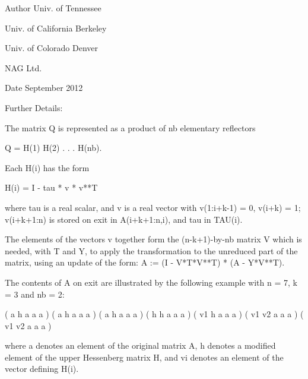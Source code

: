 \begin{DoxyAuthor}{Author}
Univ. of Tennessee 

Univ. of California Berkeley 

Univ. of Colorado Denver 

N\+A\+G Ltd. 
\end{DoxyAuthor}
\begin{DoxyDate}{Date}
September 2012 
\end{DoxyDate}
\begin{DoxyParagraph}{Further Details\+: }
\begin{DoxyVerb}  The matrix Q is represented as a product of nb elementary reflectors

     Q = H(1) H(2) . . . H(nb).

  Each H(i) has the form

     H(i) = I - tau * v * v**T

  where tau is a real scalar, and v is a real vector with
  v(1:i+k-1) = 0, v(i+k) = 1; v(i+k+1:n) is stored on exit in
  A(i+k+1:n,i), and tau in TAU(i).

  The elements of the vectors v together form the (n-k+1)-by-nb matrix
  V which is needed, with T and Y, to apply the transformation to the
  unreduced part of the matrix, using an update of the form:
  A := (I - V*T*V**T) * (A - Y*V**T).

  The contents of A on exit are illustrated by the following example
  with n = 7, k = 3 and nb = 2:

     ( a   h   a   a   a )
     ( a   h   a   a   a )
     ( a   h   a   a   a )
     ( h   h   a   a   a )
     ( v1  h   a   a   a )
     ( v1  v2  a   a   a )
     ( v1  v2  a   a   a )

  where a denotes an element of the original matrix A, h denotes a
  modified element of the upper Hessenberg matrix H, and vi denotes an
  element of the vector defining H(i).\end{DoxyVerb}
 
\end{DoxyParagraph}
